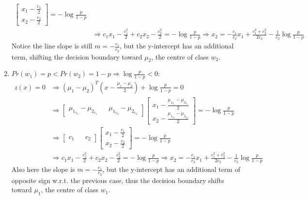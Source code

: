\begin{enumerate}
\begin{align*}
        \begin{bmatrix}
            x_1-\frac{c_1}{2} \\ x_2-\frac{c_2}{2}
        \end{bmatrix}
        =-\log{\frac{p}{1-p}}\\
        &\Rightarrow
        c_1x_1-\frac{c_1^2}{2}+c_2x_2-\frac{c_2^2}{2}=-\log{\frac{p}{1-p}}
        \Rightarrow
        x_2 = -\frac{c_1}{c_2}x_1+\frac{c_1^2+c_2^2}{2c_2}-\frac{1}{c_2}\log{\frac{p}{1-p}}
    \end{align*}
    Notice the line slope is still \(m=-\frac{c_1}{c_2}\), but the
    y-intercept has an additional term, shifting the
    decision boundary toward \(\mu_2\), the centre of class \(w_2\).
    \item \(Pr(w_1)=p<Pr(w_2)=1-p\Rightarrow\log{\frac{p}{1-p}}<0\):
    \begin{align*}
        z(x)=0
        &\Rightarrow
        (\mu_1-\mu_2)^T(x-\frac{\mu_1-\mu_2}{2})+\log{\frac{p}{1-p}}=0\\
        &\Rightarrow
        \begin{bmatrix}
            \mu_{1_{x_1}}-\mu_{2_{x_1}} && \mu_{1_{x_2}}-\mu_{2_{x_2}}
        \end{bmatrix}
        \begin{bmatrix}
            x_1-\frac{\mu_{1_{x_1}}-\mu_{2_{x_1}}}{2} \\ x_2-\frac{\mu_{1_{x_2}}-\mu_{2_{x_2}}}{2}
        \end{bmatrix}
        =-\log{\frac{p}{1-p}}\\
        &\Rightarrow
        \begin{bmatrix}
            c_1 && c_2
        \end{bmatrix}
        \begin{bmatrix}
            x_1-\frac{c_1}{2} \\ x_2-\frac{c_2}{2}
        \end{bmatrix}
        =-\log{\frac{p}{1-p}}\\
        &\Rightarrow
        c_1x_1-\frac{c_1^2}{2}+c_2x_2-\frac{c_2^2}{2}=-\log{\frac{p}{1-p}}
        \Rightarrow
        x_2 = -\frac{c_1}{c_2}x_1+\frac{c_1^2+c_2^2}{2c_2}-\frac{1}{c_2}\log{\frac{p}{1-p}}
    \end{align*}
    Also here the slope is \(m=-\frac{c_1}{c_2}\), but the
    y-intercept has an additional term of opposite sign w.r.t. the
    previous case, thus the decision boundary shifts toward
    \(\mu_1\), the centre of class \(w_1\).
  \end{enumerate}